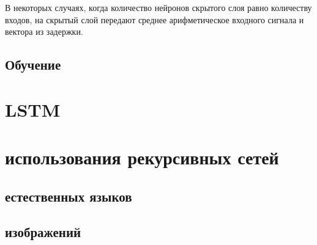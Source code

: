 \documentclass[14pt]{article}
\begin{document}
В некоторых случаях, когда количество нейронов скрытого слоя равно количеству входов, на скрытый слой передают среднее арифметическое входного сигнала и вектора из задержки.
\subsection{Обучение}


\section{\huge LSTM}

\subsection{}

\subsection{}

\subsection{}


\section{ использования рекурсивных сетей}

\subsection{ естественных языков}

\subsection{ изображений}


\section{}
\end{document}
